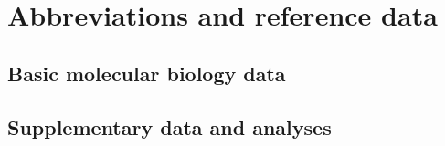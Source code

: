 \chapter{Abbreviations and reference data}

\section{Basic molecular biology data}




\clearpage

\section{Supplementary data and analyses}


